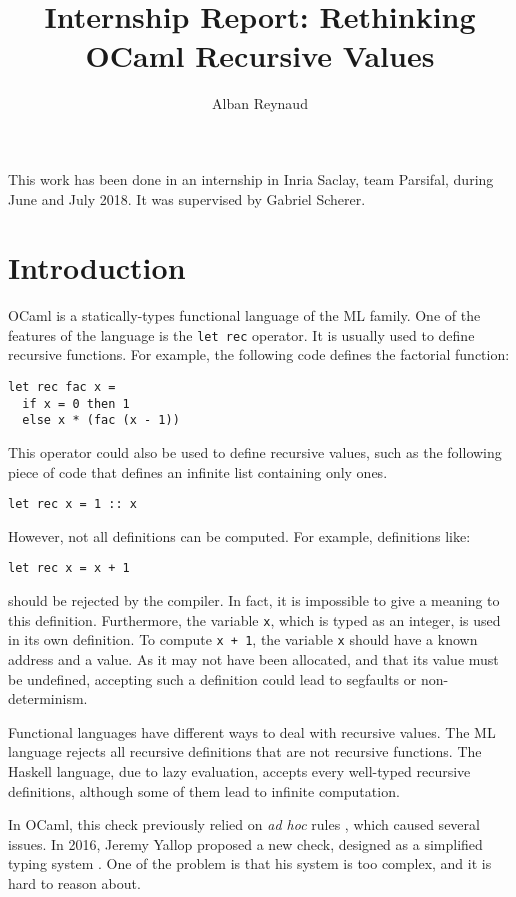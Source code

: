 \documentclass{article}
\title{Internship Report: Rethinking OCaml Recursive Values}
\author{Alban Reynaud}
\date{}
\begin{document}
\maketitle

This work has been done in an internship in Inria Saclay, team Parsifal, during
June and July 2018. It was supervised by Gabriel Scherer.

\section{Introduction}
OCaml is a statically-types functional language of the ML family. One of the
features of the language is the \lstinline|let rec| operator. It is usually
used to define recursive functions. For example, the following code defines the
factorial function:

\begin{lstlisting}
let rec fac x =
  if x = 0 then 1
  else x * (fac (x - 1))
\end{lstlisting}

This operator could also be used to define recursive values, such as the
following piece of code that defines an infinite list containing only ones.
\begin{lstlisting}
let rec x = 1 :: x
\end{lstlisting}

However, not all definitions can be computed. For example, definitions like:
\begin{lstlisting}
let rec x = x + 1
\end{lstlisting}
should be rejected by the compiler. In fact, it is impossible to give a meaning
to this definition. Furthermore, the variable \lstinline|x|, which is typed as
an integer, is used in its own definition. To compute \lstinline|x + 1|, the
variable \lstinline|x| should have a known address and a value. As it may not
have been allocated, and that its value must be undefined, accepting such a
definition could lead to segfaults or non-determinism.

Functional languages have different ways to deal with recursive values. The
ML language rejects all recursive definitions that are not recursive functions.
The Haskell language, due to lazy evaluation, accepts every well-typed recursive
definitions, although some of them lead to infinite computation.

In OCaml, this check previously relied on \textit{ad hoc} rules
\cite{PreviousRules}, which caused several issues. In 2016, Jeremy Yallop
proposed a new check, designed as a simplified typing system \cite{Yallop}.
One of the problem is that his system is too complex, and it is hard to reason
about.
\end{document}
